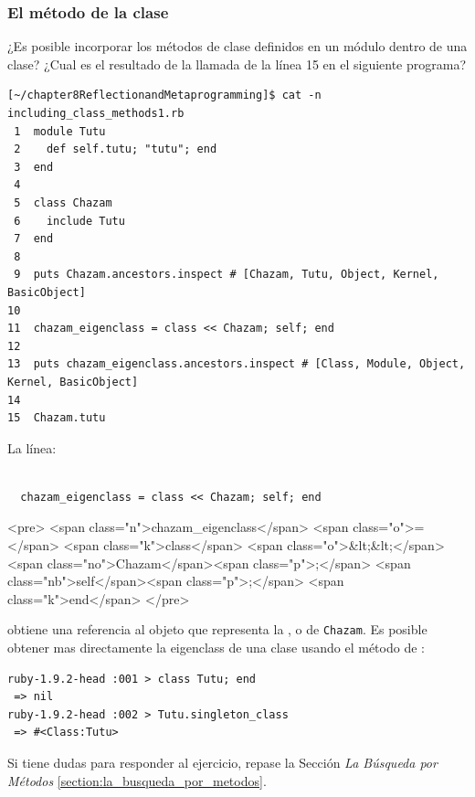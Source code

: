 \subsubsection{El método  de la clase \Object{}}
\label{susubsection:extend}
\begin{exercise}
¿Es posible incorporar los métodos de clase definidos en un módulo dentro 
de una clase? ¿Cual es el resultado de la llamada de la línea 15 en el siguiente
programa?
\begin{verbatim}
[~/chapter8ReflectionandMetaprogramming]$ cat -n including_class_methods1.rb 
 1  module Tutu
 2    def self.tutu; "tutu"; end
 3  end
 4  
 5  class Chazam
 6    include Tutu
 7  end
 8  
 9  puts Chazam.ancestors.inspect # [Chazam, Tutu, Object, Kernel, BasicObject]
10  
11  chazam_eigenclass = class << Chazam; self; end
12  
13  puts chazam_eigenclass.ancestors.inspect # [Class, Module, Object, Kernel, BasicObject]
14  
15  Chazam.tutu
\end{verbatim}
\end{exercise}
La línea:

  \begin{latexonly}
    \begin{lstlisting}

  chazam_eigenclass = class << Chazam; self; end

    \end{lstlisting}
  \end{latexonly}
    \begin{rawhtml}
    <pre>
<span class="n">chazam_eigenclass</span> <span class="o">=</span> <span class="k">class</span> <span class="o">&lt;&lt;</span> <span class="no">Chazam</span><span class="p">;</span> <span class="nb">self</span><span class="p">;</span> <span class="k">end</span>
    </pre>
    \end{rawhtml}
  
obtiene una referencia al objeto que representa la ,  o  
de \verb|Chazam|. 
Es posible obtener mas directamente la eigenclass de una clase
usando el método  de \Kernel{}:
\begin{verbatim}
ruby-1.9.2-head :001 > class Tutu; end
 => nil 
ruby-1.9.2-head :002 > Tutu.singleton_class
 => #<Class:Tutu> 
\end{verbatim}

Si tiene dudas para responder al ejercicio, 
repase la Sección \emph{La Búsqueda por Métodos} \ref{section:la_busqueda_por_metodos}.

